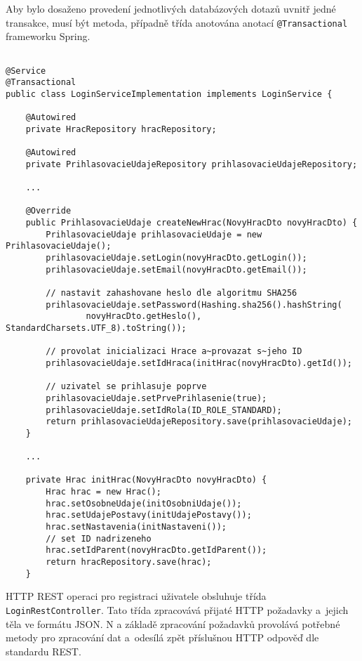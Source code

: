 \documentclass[12pt]{article}
\begin{document}
{Aby bylo dosaženo provedení jednotlivých databázových dotazů uvnitř jedné transakce,
musí být metoda, případně třída anotována anotací \texttt{@Transactional} frameworku Spring. 

\clearpage

\begin{lstlisting}

@Service
@Transactional
public class LoginServiceImplementation implements LoginService {
    
    @Autowired
    private HracRepository hracRepository;

    @Autowired
    private PrihlasovacieUdajeRepository prihlasovacieUdajeRepository;
    
    ...

    @Override
    public PrihlasovacieUdaje createNewHrac(NovyHracDto novyHracDto) {
        PrihlasovacieUdaje prihlasovacieUdaje = new PrihlasovacieUdaje();
        prihlasovacieUdaje.setLogin(novyHracDto.getLogin());
        prihlasovacieUdaje.setEmail(novyHracDto.getEmail());

        // nastavit zahashovane heslo dle algoritmu SHA256
        prihlasovacieUdaje.setPassword(Hashing.sha256().hashString(
                novyHracDto.getHeslo(), StandardCharsets.UTF_8).toString());

        // provolat inicializaci Hrace a~provazat s~jeho ID
        prihlasovacieUdaje.setIdHraca(initHrac(novyHracDto).getId());

        // uzivatel se prihlasuje poprve
        prihlasovacieUdaje.setPrvePrihlasenie(true);
        prihlasovacieUdaje.setIdRola(ID_ROLE_STANDARD);
        return prihlasovacieUdajeRepository.save(prihlasovacieUdaje);
    }

    ...

    private Hrac initHrac(NovyHracDto novyHracDto) {
        Hrac hrac = new Hrac();
        hrac.setOsobneUdaje(initOsobniUdaje());
        hrac.setUdajePostavy(initUdajePostavy());
        hrac.setNastavenia(initNastaveni());
        // set ID nadrizeneho
        hrac.setIdParent(novyHracDto.getIdParent());
        return hracRepository.save(hrac);
    }
\end{lstlisting}

\clearpage

HTTP REST operaci pro registraci uživatele obsluhuje třída \texttt{LoginRestController}. 
Tato třída zpracovává přijaté HTTP požadavky a~jejich těla ve formátu JSON.
N a základě zpracování požadavků provolává potřebné metody pro zpracování dat
a~odesílá zpět příslušnou HTTP odpověď dle standardu REST.

}
\end{document}
